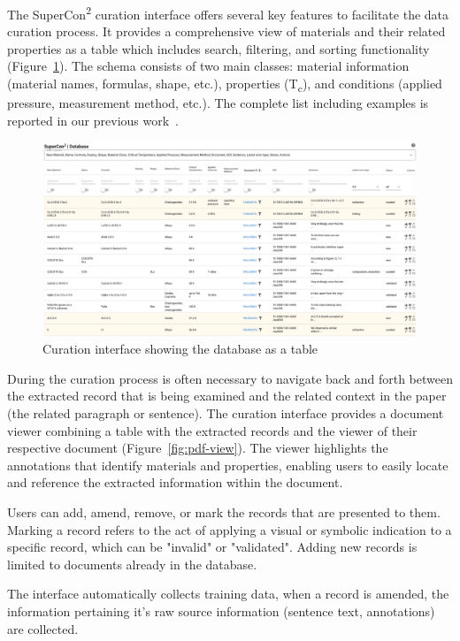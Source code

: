 \documentclass[a4paper]{article}
\begin{document}
The SuperCon\textsuperscript{2} curation interface offers several key features to facilitate the data curation process.
It provides a comprehensive view of materials and their related properties as a table which includes search, filtering, and sorting functionality (Figure~\ref{fig:curation-interface-database}). 
The schema consists of two main classes: material information (material names, formulas, shape, etc.), properties (T\textsubscript{c}), and conditions (applied pressure, measurement method, etc.). The complete list including examples is reported in our previous work~\cite{lfoppiano2023automatic}.

\begin{figure}[ht]
  \centering
  \includegraphics[width=1\textwidth]{images/supercon-curation-database} 
  \caption{Curation interface showing the database as a table}
  \label{fig:curation-interface-database}
\end{figure}


During the curation process is often necessary to navigate back and forth between the extracted record that is being examined and the related context in the paper (the related paragraph or sentence). 
The curation interface provides a document viewer combining a table with the extracted records and the viewer of their respective document (Figure~\ref{fig:pdf-view}). The viewer highlights the annotations that identify materials and properties, enabling users to easily locate and reference the extracted information within the document.

Users can add, amend, remove, or mark the records that are presented to them.  
Marking a record refers to the act of applying a visual or symbolic indication to a specific record, which can be "invalid" or "validated". 
Adding new records is limited to documents already in the database.

The interface automatically collects training data, when a record is amended, the information pertaining it's raw source information (sentence text, annotations) are collected. 
\end{document}
